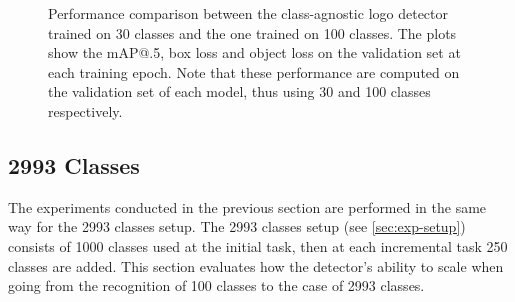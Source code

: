 \begin{figure}[H]
	\centering
    \qquad
    \qquad
    \caption{Performance comparison between the class-agnostic logo detector trained on 30 classes and the one trained on 100 classes. The plots show the mAP@.5, box loss and object loss on the validation set at each training epoch. Note that these performance are computed on the validation set of each model, thus using 30 and 100 classes respectively.}%
	\label{fig:exp-det_100}
\end{figure}


\subsection{2993 Classes}
\label{sec:2993-detector}
The experiments conducted in the previous section are performed in the same way for the 2993 classes setup.
The 2993 classes setup (see \autoref{sec:exp-setup}) consists of 1000 classes used at the initial task, then at each incremental task 250 classes are added.
This section evaluates how the detector's ability to scale when going from the recognition of 100 classes to the case of 2993 classes.

